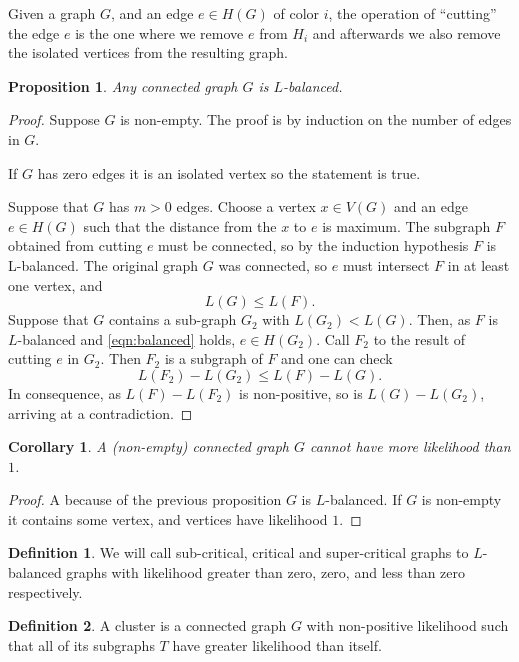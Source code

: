 \documentclass[11pt,notitlepage,a4paper]{article}
\newtheorem{proposition}{Proposition}[section]
\newtheorem{corollary}{Corollary}[section]
\theoremstyle{definition}
\newtheorem{definition}{Definition}[section]
\begin{document}
Given a graph $G$, and an edge $e\in H(G)$ of color $i$,
the operation of ``cutting'' the edge $e$ is the one where we remove 
$e$ from $H_i$ and afterwards we also remove the isolated 
vertices from the resulting graph.



\begin{proposition} \label{prop:balanced}
	Any connected graph $G$ is $L$-balanced. 
\end{proposition}
	\begin{proof}
		Suppose $G$ is non-empty.
		The proof is by induction on the number of edges in $G$. 
		\item If $G$ has zero edges it is an isolated vertex so the statement is true.
		\item Suppose that $G$ has $m>0$ edges. Choose a vertex $x\in V(G)$ and
		an edge $e\in H(G)$ such that the distance from the $x$ to $e$ is maximum. 
		The subgraph $F$ obtained from cutting $e$ must be connected, so by the
		induction hypothesis $F$ is L-balanced. 
		The original graph $G$ was connected, 
		so $e$ must intersect $F$ in at least one vertex, and
		\begin{equation}\label{eqn:balanced}
		L(G)\leq L(F).
		\end{equation}
		Suppose that $G$ contains a sub-graph $G_2$ with 
		$L(G_2)<L(G)$. Then, as $F$ is $L$-balanced and
		\ref{eqn:balanced} holds, $e\in H(G_2)$. Call $F_2$
		to the result of cutting $e$ in $G_2$. Then
		$F_2$ is a subgraph of $F$ and one can check
		\[ L(F_2) - L(G_2) \leq L(F)-L(G).\]
		In consequence, as $L(F)-L(F_2)$ is non-positive, 
		so is $L(G)-L(G_2)$, arriving at a contradiction.
	\end{proof}


\begin{corollary}
	A (non-empty) connected graph $G$ cannot have more likelihood than $1$.
\end{corollary}
\begin{proof}
	A because of the previous proposition $G$ is $L$-balanced.
	If $G$ is non-empty it contains some vertex,
	and vertices have likelihood $1$.
\end{proof}

\begin{definition} 
	We will call sub-critical, critical and super-critical
	graphs to $L$-balanced graphs with likelihood greater than
	zero, zero, and less than zero respectively. 
\end{definition}

\begin{definition}
	A cluster is a connected graph $G$ with non-positive likelihood such 
	that all of its subgraphs $T$ have greater likelihood
	than itself. 
\end{definition}
\end{document}
